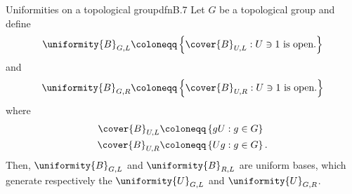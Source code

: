 \begin{prp}{Uniformities on a topological group}{dfnB.7}
Let $G$ be a topological group and define
\begin{equation}\label{B.8}
\uniformity{B}_{G,L}\coloneqq \left\{ \cover{B}_{U,L}:U\ni 1\text{ is open.}\right\}
\end{equation}
and
\begin{equation}
\uniformity{B}_{G,R}\coloneqq \left\{ \cover{B}_{U,R}:U\ni 1\text{ is open.}\right\} 
\end{equation}
where
\begin{subequations}\label{1.9}
\begin{align}
\cover{B}_{U,L} & \coloneqq \left\{ gU:g\in G\right\} \\
\cover{B}_{U,R} & \coloneqq \left\{ Ug:g\in G\right\} .
\end{align}
\end{subequations}
Then, $\uniformity{B}_{G,L}$ and $\uniformity{B}_{R,L}$ are uniform bases, which generate respectively the  $\uniformity{U}_{G,L}$ and  $\uniformity{U}_{G,R}$.


\end{prp}
